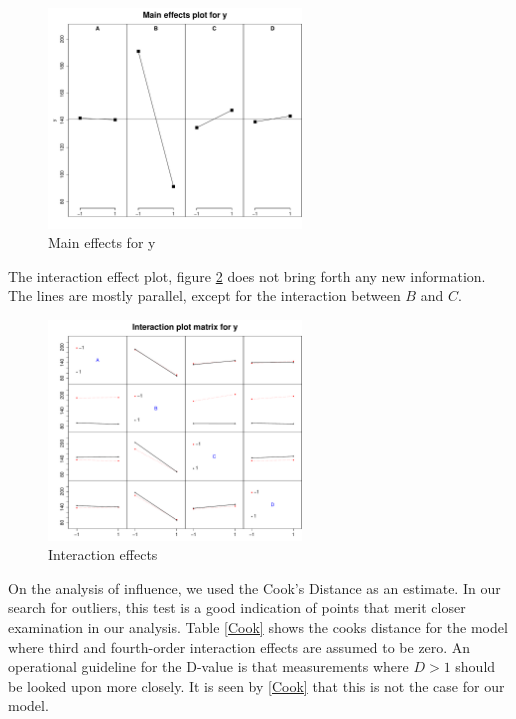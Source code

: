 \begin{figure}[H]
    \centering
    \includegraphics[width=0.6\textwidth]{PDF/mainEffects4factors.pdf}
    \caption{Main effects for y}
    \label{fig:mainEff}
\end{figure}

The interaction effect plot, figure \ref{fig:interaction} does not bring forth any new information. The lines are mostly parallel, except  for the interaction between $B$ and $C$.

\begin{figure}[H]
    \centering
    \includegraphics[width=0.6\textwidth]{PDF/interactionPlot4factors.pdf}
    \caption{Interaction effects}
    \label{fig:interaction}
\end{figure}

On the analysis of influence, we used the Cook's Distance as an estimate. In our search for outliers, this test is a good indication of points that merit closer examination in our analysis. Table \ref{Cook} shows the cooks distance for the model where third and fourth-order interaction effects are assumed to be zero. An operational guideline for the D-value is that measurements where $D>1$ should be looked upon more closely. It is seen by \ref{Cook} that this is not the case for our model.

